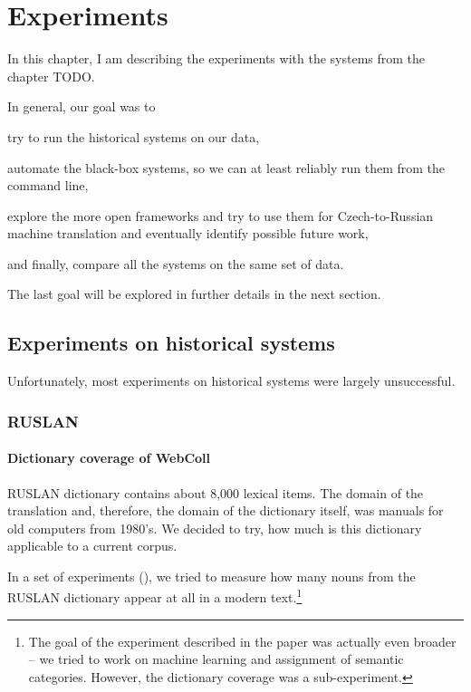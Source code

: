 \chapter{Experiments}
In this chapter, I am describing the experiments with the systems from the chapter TODO.

In general, our goal was to 
\begin{pitemize}
\item try to run the historical systems on our data,
\item automate the black-box systems, so we can at least reliably run them from the command line,
\item explore the more open frameworks and try to use them for Czech-to-Russian machine translation and eventually identify possible future work,
\item and finally, compare all the systems on the same set of data.
\end{pitemize}

The last goal will be explored in further details in the next section.

\section{Experiments on historical systems}
Unfortunately, most experiments on historical systems were largely unsuccessful.

\subsection{RUSLAN}
\subsubsection{Dictionary coverage of WebColl}

RUSLAN dictionary contains about 8,000 lexical items. The domain of the translation and, therefore, the domain of the dictionary itself, was manuals for old computers from 1980's. We decided to try, how much is this dictionary applicable to a current corpus.

In a set of experiments (\cite{florida}), we tried to measure how many nouns from the RUSLAN dictionary appear at all in a modern text.\footnote{The goal of the experiment described in the paper was actually even broader -- we tried to work on machine learning and assignment of semantic categories. However, the dictionary coverage was a sub-experiment.} 

